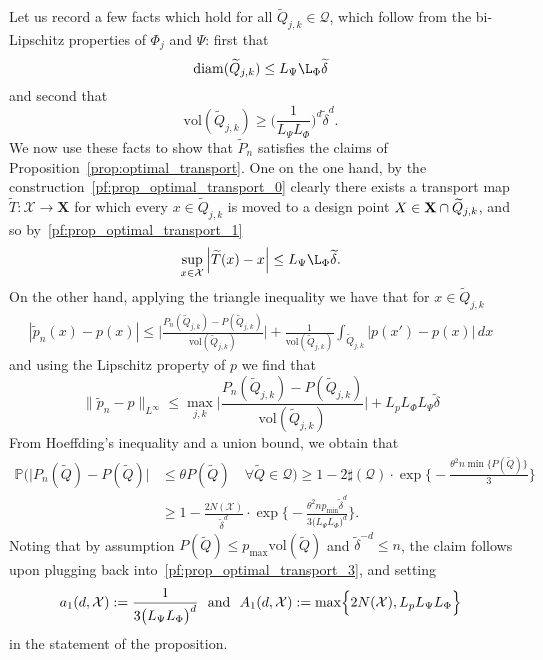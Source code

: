\documentclass[twoside]{article}
\newcommand{\abs}[1]{\left \lvert #1 \right \rvert}
\newcommand{\diam}{\mathrm{diam}}
\newcommand{\vol}{\text{vol}}
\newcommand{\1}{\mathbf{1}}
\newcommand{\Xset}{\mathcal{X}}
\newcommand{\Leb}{L}
\newcommand{\mc}[1]{\mathcal{#1}}
\newcommand{\wt}[1]{\widetilde{#1}}
\theoremstyle{definition}
\theoremstyle{remark}
\begin{document}
Let us record a few facts which hold for all $\wt{Q}_{j,k} \in \mc{Q}$, which follow from the bi-Lipschitz properties of $\Phi_j$ and $\Psi$: first that
\begin{equation}
\label{pf:prop_optimal_transport_1}
\diam(\wt{Q}_{j,k}) \leq L_{\Psi} \L_{\Phi} \wt{\delta}
\end{equation}
and second that
\begin{equation}
\label{pf:prop_optimal_transport_2}
\vol(\wt{Q}_{j,k}) \geq \biggl(\frac{1}{L_{\Psi} L_{\Phi}}\biggr)^d \wt{\delta}^d.
\end{equation}
We now use these facts to show that $\wt{P}_n$ satisfies the claims of Proposition~\ref{prop:optimal_transport}. One on the one hand, by the construction~\eqref{pf:prop_optimal_transport_0} clearly there exists a transport map $\wt{T}: \Xset \to \mathbf{X}$ for which every $x \in \wt{Q}_{j,k}$ is moved to a design point $X \in {\bf X} \cap \wt{Q}_{j,k}$, and so by~\eqref{pf:prop_optimal_transport_1}
\begin{equation*}
\sup_{x \in \Xset} \abs{\wt{T}(x) - x} \leq  L_{\Psi} \L_{\Phi} \wt{\delta}.
\end{equation*}
On the other hand, applying the triangle inequality we have that for $x \in \wt{Q}_{j,k}$
\begin{align*}
|\wt{p}_n(x) - p(x)| \leq \biggl|\frac{P_n(\wt{Q}_{j,k}) - P(\wt{Q}_{j,k})}{\vol(\wt{Q}_{j,k})}\biggr| + \frac{1}{\vol(\wt{Q}_{j,k})} \int_{\wt{Q}_{j,k}} |p(x') - p(x)| \,dx 
\end{align*}
and using the Lipschitz property of $p$ we find that 
\begin{equation}
\label{pf:prop_optimal_transport_3}
\|\wt{p}_n - p\|_{\Leb^{\infty}} \leq \max_{j,k} \biggl|\frac{P_n(\wt{Q}_{j,k}) - P(\wt{Q}_{j,k})}{\vol(\wt{Q}_{j,k})}\biggr| + L_p L_{\Phi} L_{\Psi} \wt{\delta}
\end{equation}
From Hoeffding's inequality and a union bound, we obtain that 
\begin{align*}
\mathbb{P}\biggl( \bigl|P_n(\wt{Q}) - P(\wt{Q})\bigr| & \leq \theta P(\wt{Q}) \quad \forall \wt{Q} \in \mc{Q} \biggr) \geq 1 - 2 \sharp(\mc{Q}) \cdot \exp\biggl\{-\frac{\theta^2 n \min \{P(\wt{Q})\}}{3}\biggr\} \\
& \geq 1 - \frac{2 N(\Xset)}{\wt{\delta}^d} \cdot \exp\biggl\{-\frac{\theta^2 n p_{\min} \wt{\delta}^d }{3\bigl(L_{\Psi} L_{\Phi}\bigr)^d}\biggr\}.
\end{align*}
Noting that by assumption $P(\wt{Q}) \leq p_{\max} \vol(\wt{Q})$ and $\wt{\delta}^{-d} \leq n$, the claim follows upon plugging back into~\eqref{pf:prop_optimal_transport_3}, and setting
\begin{equation*}
a_1(d, \Xset) := \frac{1}{3\bigl(L_{\Psi} L_{\Phi}\bigr)^d}~~\textrm{and}~~A_1(d,\Xset) := \max \Bigl\{2N(\Xset),L_p L_{\Psi} L_{\Phi} \Bigr\}
\end{equation*}
in the statement of the proposition.
\end{document}
